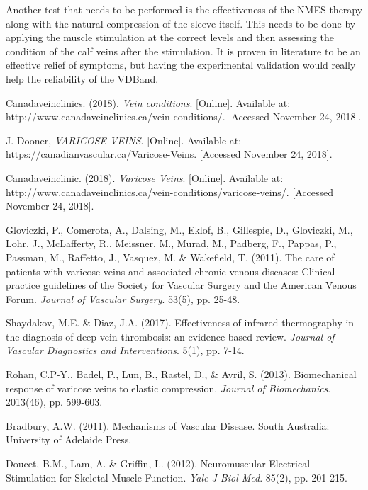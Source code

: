 \documentclass[11.5pt]{article}
\begin{document}
Another test that needs to be performed is the effectiveness of the NMES therapy along with the natural  compression of the sleeve itself. This needs to be done by applying the muscle stimulation at the correct levels and then assessing the condition of the calf veins after the stimulation. It is proven in literature to be an effective relief of symptoms, but having the experimental validation would really help the reliability of the VDBand. 


\pagebreak
\begin{thebibliography}{9}

Canadaveinclinics. (2018). \textit{Vein conditions}. [Online]. Available at: http://www.canadaveinclinics.ca/vein-conditions/. [Accessed November 24, 2018].

J. Dooner, \textit{VARICOSE VEINS}. [Online]. Available at: https://canadianvascular.ca/Varicose-Veins. [Accessed November 24, 2018].

Canadaveinclinic. (2018). \textit{Varicose Veins}. [Online]. Available at: http://www.canadaveinclinics.ca/vein-conditions/varicose-veins/. [Accessed November 24, 2018].

Gloviczki, P., Comerota, A., Dalsing, M., Eklof, B., Gillespie, D., Gloviczki, M., Lohr, J., McLafferty, R., Meissner, M., Murad, M., Padberg, F., Pappas, P., Passman, M., Raffetto, J., Vasquez, M. \& Wakefield, T. (2011). The care of patients with varicose veins and associated chronic venous diseases: Clinical practice guidelines of the Society for Vascular Surgery and the American Venous Forum. \emph{Journal of Vascular Surgery}. 53(5), pp. 25-48.

Shaydakov, M.E. \& Diaz, J.A. (2017). Effectiveness of infrared thermography in the diagnosis of deep vein thrombosis: an evidence-based review. \emph{Journal of Vascular Diagnostics and Interventions}. 5(1), pp. 7-14.

Rohan, C.P-Y., Badel, P., Lun, B., Rastel, D., \& Avril, S. (2013). Biomechanical response of varicose veins to elastic compression. \emph{Journal of Biomechanics}. 2013(46), pp. 599-603.

Bradbury, A.W. (2011). Mechanisms of Vascular Disease. South Australia: University of Adelaide Press.

Doucet, B.M., Lam, A. \& Griffin, L. (2012). Neuromuscular Electrical Stimulation for Skeletal Muscle Function. \emph{Yale J Biol Med}. 85(2), pp. 201-215.


\end{thebibliography}
\end{document}
